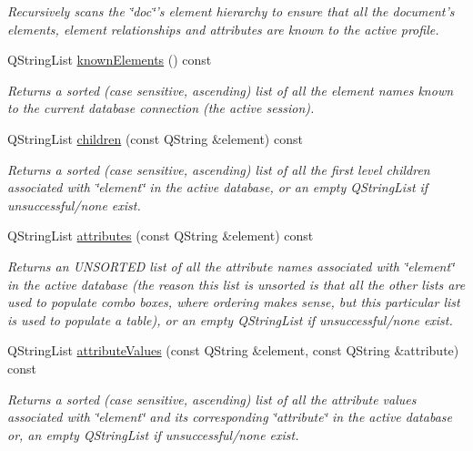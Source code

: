 \begin{DoxyCompactItemize}
\begin{DoxyCompactList}\small\item\em \-Recursively scans the \char`\"{}doc\char`\"{}'s element hierarchy to ensure that all the document's elements, element relationships and attributes are known to the active profile. \end{DoxyCompactList}\item 
\-Q\-String\-List \hyperlink{class_g_c_data_base_interface_a6c4eabd4f39a1c23ab320bb0dbc855d4}{known\-Elements} () const 
\begin{DoxyCompactList}\small\item\em \-Returns a sorted (case sensitive, ascending) list of all the element names known to the current database connection (the active session). \end{DoxyCompactList}\item 
\-Q\-String\-List \hyperlink{class_g_c_data_base_interface_aab5126783bc3acc7c718c8ffd8af62bc}{children} (const \-Q\-String \&element) const 
\begin{DoxyCompactList}\small\item\em \-Returns a sorted (case sensitive, ascending) list of all the first level children associated with \char`\"{}element\char`\"{} in the active database, or an empty \-Q\-String\-List if unsuccessful/none exist. \end{DoxyCompactList}\item 
\-Q\-String\-List \hyperlink{class_g_c_data_base_interface_afb1e49e08f98ca453f9ac66340a35642}{attributes} (const \-Q\-String \&element) const 
\begin{DoxyCompactList}\small\item\em \-Returns an \-U\-N\-S\-O\-R\-T\-E\-D list of all the attribute names associated with \char`\"{}element\char`\"{} in the active database (the reason this list is unsorted is that all the other lists are used to populate combo boxes, where ordering makes sense, but this particular list is used to populate a table), or an empty \-Q\-String\-List if unsuccessful/none exist. \end{DoxyCompactList}\item 
\-Q\-String\-List \hyperlink{class_g_c_data_base_interface_a329e17f6c02c62fd554884f2b5a7e2df}{attribute\-Values} (const \-Q\-String \&element, const \-Q\-String \&attribute) const 
\begin{DoxyCompactList}\small\item\em \-Returns a sorted (case sensitive, ascending) list of all the attribute values associated with \char`\"{}element\char`\"{} and its corresponding \char`\"{}attribute\char`\"{} in the active database or, an empty \-Q\-String\-List if unsuccessful/none exist. \end{DoxyCompactList}\item 

\end{DoxyCompactItemize}
